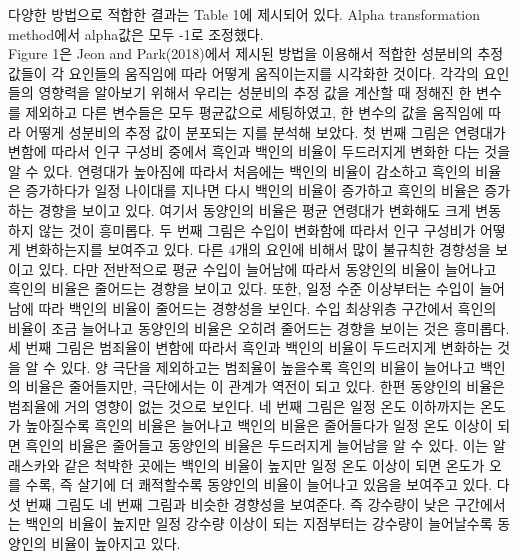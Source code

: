 다양한 방법으로 적합한 결과는 Table 1에 제시되어 있다. Alpha transformation method에서 alpha값은 모두 -1로 조정했다. 
\\
Figure 1은 Jeon and Park(2018)에서 제시된 방법을 이용해서 적합한 성분비의 추정 값들이 각 요인들의 움직임에 따라 어떻게 움직이는지를 시각화한 것이다. 각각의 요인들의 영향력을 알아보기 위해서 우리는 성분비의 추정 값을 계산할 때 정해진 한 변수를 제외하고 다른 변수들은 모두 평균값으로 세팅하였고, 한 변수의 값을 움직임에 따라 어떻게 성분비의 추정 값이 분포되는 지를 분석해 보았다. 첫 번째 그림은 연령대가 변함에 따라서 인구 구성비 중에서 흑인과 백인의 비율이 두드러지게 변화한 다는 것을 알 수 있다. 연령대가 높아짐에 따라서 처음에는 백인의 비율이 감소하고 흑인의 비율은 증가하다가 일정 나이대를 지나면 다시 백인의 비율이 증가하고 흑인의 비율은 증가하는 경향을 보이고 있다. 여기서 동양인의 비율은 평균 연령대가 변화해도 크게 변동하지 않는 것이 흥미롭다. 두 번째 그림은 수입이 변화함에 따라서 인구 구성비가 어떻게 변화하는지를 보여주고 있다. 다른 4개의 요인에 비해서 많이 불규칙한 경향성을 보이고 있다. 다만 전반적으로 평균 수입이 늘어남에 따라서 동양인의 비율이 늘어나고 흑인의 비율은 줄어드는 경향을 보이고 있다. 또한, 일정 수준 이상부터는 수입이 늘어남에 따라 백인의 비율이 줄어드는 경향성을 보인다. 수입 최상위층 구간에서 흑인의 비율이 조금 늘어나고 동양인의 비율은 오히려 줄어드는 경향을 보이는 것은 흥미롭다. 세 번째 그림은 범죄율이 변함에 따라서 흑인과 백인의 비율이 두드러지게 변화하는 것을 알 수 있다. 양 극단을 제외하고는 범죄율이 높을수록 흑인의 비율이 늘어나고 백인의 비율은 줄어들지만, 극단에서는 이 관계가 역전이 되고 있다. 한편 동양인의 비율은 범죄율에 거의 영향이 없는 것으로 보인다. 네 번째 그림은 일정 온도 이하까지는 온도가 높아질수록 흑인의 비율은 늘어나고 백인의 비율은 줄어들다가 일정 온도 이상이 되면 흑인의 비율은 줄어들고 동양인의 비율은 두드러지게 늘어남을 알 수 있다. 이는 알래스카와 같은 척박한 곳에는 백인의 비율이 높지만 일정 온도 이상이 되면 온도가 오를 수록, 즉 살기에 더 쾌적할수록 동양인의 비율이 늘어나고 있음을 보여주고 있다. 다섯 번째 그림도 네 번째 그림과 비슷한 경향성을 보여준다. 즉 강수량이 낮은 구간에서는 백인의 비율이 높지만 일정 강수량 이상이 되는 지점부터는 강수량이 늘어날수록 동양인의 비율이 높아지고 있다.





